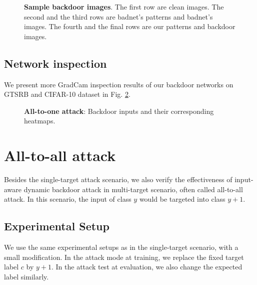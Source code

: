 \begin{figure}[t]
    \vspace{-1mm}
\caption{{\bfseries Sample backdoor images}. The first row are clean images. The second and the third rows are badnet's patterns and badnet's images. The fourth and the final rows are our patterns and backdoor images.}
    \vspace{-4mm}
\label{fig:all2one_sample}
\end{figure}

\subsection{Network inspection}
We present more GradCam inspection results of our backdoor networks on GTSRB and CIFAR-10 dataset in Fig. \ref{fig:gradcam_all2one}.

\begin{figure}[t]
\centering
{}
\hspace{2mm}
    \vspace{-1mm}
\caption{{\bfseries All-to-one attack}: Backdoor inputs and their corresponding heatmaps.}
\label{fig:gradcam_all2one}
\end{figure}

\section{All-to-all attack}
Besides the single-target attack scenario, we also verify the effectiveness of input-aware dynamic backdoor attack in multi-target scenario, often called all-to-all attack. In this scenario, the input of class $y$ would be targeted into class $y + 1$.
\subsection{Experimental Setup}
We use the same experimental setups as in the single-target scenario, with a small modification. In the attack mode at training, we replace the fixed target label $c$ by $y+1$. In the attack test at evaluation, we also change the expected label similarly.

